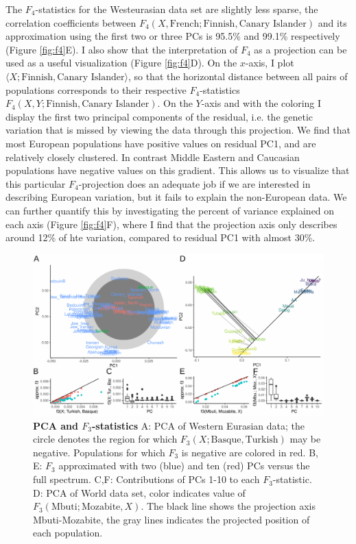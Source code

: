 \documentclass[12pt,a4pape, fullpage]{article}
\begin{document}
The $F_4$-statistics for the Westeurasian data set are slightly less sparse, the correlation coefficients between $F_4(X, \text{French}; \text{Finnish}, \text{Canary Islander})$ and its approximation using the first two or three PCs is 95.5\% and 99.1\% respectively (Figure \ref{fig:f4}E). I also show that the interpretation of $F_4$ as a projection can be used as a useful visualization (Figure \ref{fig:f4}D). On the $x$-axis, I plot $\langle X; \text{Finnish}, \text{Canary Islander}\rangle$, so that the horizontal distance between all pairs of populations corresponds to their respective $F_4$-statistics $F_4(X, Y; \text{Finnish}, \text{Canary Islander})$. On the $Y$-axis and with the coloring I display the first two principal components of the residual, i.e. the genetic variation that is missed by viewing the data through this projection. We find that most European populations have positive values on residual PC1, and are relatively closely clustered. In contrast Middle Eastern and Caucasian populations have negative values on this gradient. This allows us to visualize that this particular $F_4$-projection does an adequate job if we are interested in describing European variation, but it fails to explain the non-European data. We can further quantify this by investigating the percent of variance explained on each axis (Figure \ref{fig:f4}F), where I find that the projection axis only describes around 12\% of hte variation, compared to residual PC1 with almost 30\%.


\begin{figure}[!ht]
	\includegraphics[width=\textwidth]{figures/fig_f3_data.pdf}
	\caption{\textbf{PCA and $F_3$-statistics} A: PCA of Western Eurasian data; the circle denotes the region for which $F_3(X; \text{Basque}, \text{Turkish})$ may be negative. Populations for which $F_3$ is negative are colored in red. B, E: $F_3$ approximated with two (blue) and ten (red) PCs versus the full spectrum. C,F: Contributions of PCs 1-10 to each $F_3$-statistic. D: PCA of World data set, color indicates value of $F_3(\text{Mbuti}; \text{Mozabite}, X)$. The black line shows the projection axis Mbuti-Mozabite, the gray lines indicates the projected position of each population. }
	\label{fig:f3}
\end{figure}
\end{document}
